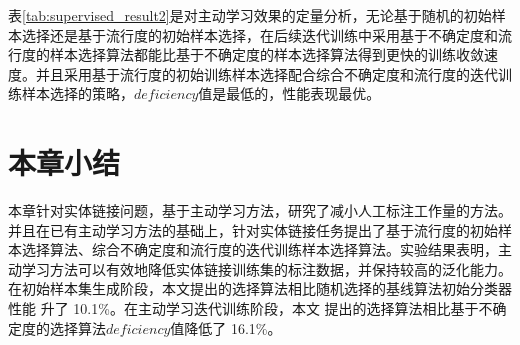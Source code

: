 表\ref{tab:supervised_result2}是对主动学习效果的定量分析，无论基于随机的初始样本选择还是基于流行度的初始样本选择，在后续迭代训练中采用基于不确定度和流行度的样本选择算法都能比基于不确定度的样本选择算法得到更快的训练收敛速度。并且采用基于流行度的初始训练样本选择配合综合不确定度和流行度的迭代训练样本选择的策略，$deficiency$值是最低的，性能表现最优。

\section{本章小结}
本章针对实体链接问题，基于主动学习方法，研究了减小人工标注工作量的方法。并且在已有主动学习方法的基础上，针对实体链接任务提出了基于流行度的初始样本选择算法、综合不确定度和流行度的迭代训练样本选择算法。实验结果表明，主动学习方法可以有效地降低实体链接训练集的标注数据，并保持较高的泛化能力。在初始样本集生成阶段，本文提出的选择算法相比随机选择的基线算法初始分类器性能 升了 10.1\%。在主动学习迭代训练阶段，本文 提出的选择算法相比基于不确定度的选择算法$deficiency$值降低了 16.1\%。
